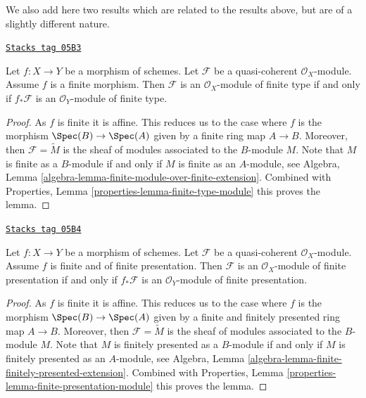 We also add here two results which are related to the results above, but
are of a slightly different nature.

\begin{lemma}
\label{descent-lemma-finite-over-finite-module}
\href{https://stacks.math.columbia.edu/tag/05B3}{\texttt{Stacks tag 05B3}}

Let $f : X \to Y$ be a morphism of schemes.
Let $\mathcal{F}$ be a quasi-coherent $\mathcal{O}_X$-module.
Assume $f$ is a finite morphism.
Then $\mathcal{F}$ is an $\mathcal{O}_X$-module of finite type
if and only if $f_*\mathcal{F}$ is an $\mathcal{O}_Y$-module of finite
type.
\end{lemma}

\begin{proof}
As $f$ is finite it is affine. This reduces us to the case where
$f$ is the morphism $\Spec(B) \to \Spec(A)$ given
by a finite ring map $A \to B$.
Moreover, then $\mathcal{F} = \widetilde{M}$ is the sheaf of modules
associated to the $B$-module $M$.
Note that $M$ is finite as a $B$-module if and only if
$M$ is finite as an $A$-module, see
Algebra, Lemma \ref{algebra-lemma-finite-module-over-finite-extension}.
Combined with
Properties, Lemma \ref{properties-lemma-finite-type-module}
this proves the lemma.
\end{proof}

\begin{lemma}
\label{descent-lemma-finite-finitely-presented-module}
\href{https://stacks.math.columbia.edu/tag/05B4}{\texttt{Stacks tag 05B4}}

Let $f : X \to Y$ be a morphism of schemes.
Let $\mathcal{F}$ be a quasi-coherent $\mathcal{O}_X$-module.
Assume $f$ is finite and of finite presentation.
Then $\mathcal{F}$ is an $\mathcal{O}_X$-module of finite presentation
if and only if $f_*\mathcal{F}$ is an $\mathcal{O}_Y$-module of finite
presentation.
\end{lemma}

\begin{proof}
As $f$ is finite it is affine. This reduces us to the case where
$f$ is the morphism $\Spec(B) \to \Spec(A)$ given
by a finite and finitely presented ring map $A \to B$.
Moreover, then $\mathcal{F} = \widetilde{M}$ is the sheaf of modules
associated to the $B$-module $M$.
Note that $M$ is finitely presented as a $B$-module if and only if
$M$ is finitely presented as an $A$-module, see
Algebra, Lemma \ref{algebra-lemma-finite-finitely-presented-extension}.
Combined with
Properties, Lemma \ref{properties-lemma-finite-presentation-module}
this proves the lemma.
\end{proof}

